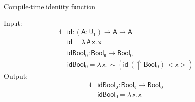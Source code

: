 \documentclass[dvipsnames,aspectratio=169]{beamer}
\newcommand{\msf}[1]{\mathsf{#1}}
\newcommand{\Lift}{{\Uparrow}}
\newcommand{\spl}{{\sim}}
\newcommand{\qut}[1]{{<}#1{>}}
\newcommand{\U}{\msf{U}}
\newcommand{\Bool}{\msf{Bool}}
\newcommand{\id}{\msf{id}}
\theoremstyle{remark}
\newcommand{\msA}{\msf{A}}
\newcommand{\msx}{\msf{x}}
\begin{document}
\begin{frame}{Compile-time identity function}

Input:
\begin{alignat*}{4}
  & \id : (\msA : \U_1) \to \msA \to \msA\\
  & \id = \lambda\,\msA\,\msx.\,\msx     \\
  & \\
  & \msf{idBool_0} : \Bool_0 \to \Bool_0\\
  & \msf{idBool_0} = \lambda\,\msx.\,\spl(\id\,(\Lift \Bool_0)\,\qut{\msx})
\end{alignat*}
\pause
Output:
\begin{alignat*}{4}
  & \msf{idBool_0} : \Bool_0 \to \Bool_0\\
  & \msf{idBool_0} = \lambda\,\msx.\,\msx
\end{alignat*}

\end{frame}
\end{document}
